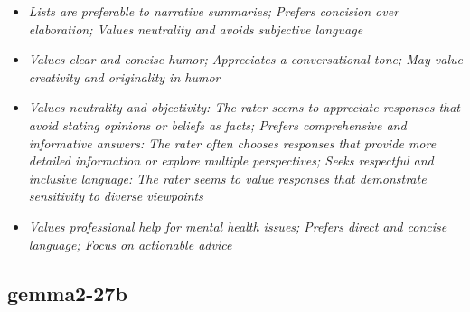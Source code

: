 \documentclass[11pt]{article}
\newcommand{\profiletext}[1]{\textit{#1}}
\begin{document}
\begin{itemize}
\item \profiletext{Lists are preferable to narrative summaries; Prefers concision over elaboration; Values neutrality and avoids subjective language}
\item \profiletext{Values clear and concise humor; Appreciates a conversational tone; May value creativity and originality in humor}
\item \profiletext{Values neutrality and objectivity:  The rater seems to appreciate responses that avoid stating opinions or beliefs as facts; Prefers comprehensive and informative answers:  The rater often chooses responses that provide more detailed information or explore multiple perspectives; Seeks respectful and inclusive language:  The rater seems to value responses that demonstrate sensitivity to diverse viewpoints}
\item \profiletext{Values professional help for mental health issues; Prefers direct and concise language; Focus on actionable advice}
\end{itemize}

\subsection{gemma2-27b}
\end{document}
